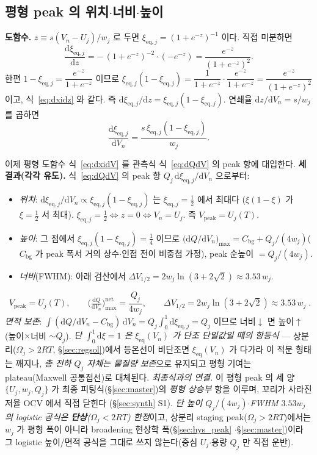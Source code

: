 \documentclass[11pt,a4paper]{article}
\newcommand{\dd}{\mathrm{d}}
\newcommand{\eq}{\mathrm{eq}}
\newcommand{\bg}{\mathrm{bg}}
\newcommand{\peak}{\mathrm{peak}}
\begin{document}
\subsection{평형 peak 의 위치$\cdot$너비$\cdot$높이}
\textbf{도함수.} $z\equiv s(V_n-U_j)/w_j$ 로 두면 $\xi_{\eq,j}=(1+e^{-z})^{-1}$ 이다. 직접 미분하면
\begin{equation}
\frac{\dd\xi_{\eq,j}}{\dd z}=-\,(1+e^{-z})^{-2}\cdot(-e^{-z})=\frac{e^{-z}}{(1+e^{-z})^2}.
\label{eq:dxidz}
\end{equation}
한편 $1-\xi_{\eq,j}=\dfrac{e^{-z}}{1+e^{-z}}$ 이므로 $\xi_{\eq,j}(1-\xi_{\eq,j})=\dfrac{1}{1+e^{-z}}\cdot
\dfrac{e^{-z}}{1+e^{-z}}=\dfrac{e^{-z}}{(1+e^{-z})^2}$ 이고, 식~\eqref{eq:dxidz} 와 같다. 즉
$\dd\xi_{\eq,j}/\dd z=\xi_{\eq,j}(1-\xi_{\eq,j})$. 연쇄율 $\dd z/\dd V_n=s/w_j$ 를 곱하면
\begin{equation}
\frac{\dd\xi_{\eq,j}}{\dd V_n}=\frac{s\,\xi_{\eq,j}(1-\xi_{\eq,j})}{w_j}.
\label{eq:dxidV}
\end{equation}

이제 평형 도함수 식~\eqref{eq:dxidV} 를 관측식 식~\eqref{eq:dQdV} 의 peak 항에 대입한다.
\textbf{세 결과(각각 유도).} 식~\eqref{eq:dQdV} 의 peak 항 $Q_j\,\dd\xi_{\eq,j}/\dd V_n$ 으로부터:
\begin{itemize}[leftmargin=1.6em,itemsep=2pt]
\item \emph{위치}: $\dd\xi_{\eq,j}/\dd V_n\propto\xi_{\eq,j}(1-\xi_{\eq,j})$ 는 $\xi_{\eq,j}=\tfrac12$ 에서 최대다
  ($\xi(1-\xi)$ 가 $\xi=\tfrac12$ 서 최대). $\xi_{\eq,j}=\tfrac12\Leftrightarrow z=0\Leftrightarrow V_n=U_j$. 즉
  $V_\peak=U_j(T)$.
\item \emph{높이}: 그 점에서 $\xi_{\eq,j}(1-\xi_{\eq,j})=\tfrac14$ 이므로
  $\big(\dd Q/\dd V_n\big)_{\max}=C_\bg+Q_j/(4w_j)$($C_\bg$ 가 peak 폭서 거의 상수$\cdot$인접 전이 비중첩 가정), peak 순높이 $=Q_j/(4w_j)$.
\item \emph{너비}(FWHM): 아래 검산에서 $\Delta V_{1/2}=2w_j\ln(3+2\sqrt2)\approx3.53\,w_j$.
\end{itemize}
\begin{equation}
\boxed{\;V_\peak=U_j(T),\qquad \Big(\tfrac{\dd Q}{\dd V_n}\Big)^{\text{net}}_{\max}=\frac{Q_j}{4w_j},\qquad
\Delta V_{1/2}=2w_j\ln(3+2\sqrt2)\approx3.53\,w_j\;.}
\label{eq:eqpeak}
\end{equation}
\emph{면적 보존}: $\int(\dd Q/\dd V_n-C_\bg)\,\dd V_n=Q_j\int_0^1\dd\xi_{\eq,j}=Q_j$ 이므로 너비$\downarrow$ 면
높이$\uparrow$(높이$\times$너비 $\sim Q_j$). \emph{단 $\int_0^1\dd\xi=1$ 은 $\xi_{\eq}(V_n)$ 가 단조 단일값일 때의 항등식} —
상분리($\Omega_j>2RT$, \S\ref{sec:regsol})에서 등온선이 비단조면 $\xi_{\eq}(V_n)$ 가 다가라 이 적분 형태는 깨지나,
\emph{총 전하 $Q_j$ 자체는 물질량 보존}으로 유지되고 평형 기여는 plateau(Maxwell 공통접선)로 대체된다. \emph{최종식과의 연결.} 이 평형 peak 의 세 양 $\{U_j,w_j,Q_j\}$ 가
최종 피팅식(\S\ref{sec:master})의 \emph{평형 상승부} 항을 이루며, 꼬리가 사라진 저율 OCV 에서 직접 닫힌다
(\S\ref{sec:synth} S1). \emph{단 높이 $Q_j/(4w_j)$$\cdot$FWHM $3.53w_j$ 의 logistic 공식은 \textbf{단상}($\Omega_j<2RT$)
한정}이고, 상분리 staging peak($\Omega_j>2RT$)에서는 $w_j$ 가 평형 폭이 아니라 broadening 현상학 폭(\S\ref{sec:hys_peak}
$\cdot$\S\ref{sec:master})이라 그 logistic 높이/면적 공식을 그대로 쓰지 않는다(중심 $U_j$$\cdot$용량 $Q_j$ 만 직접 운반).
\end{document}
